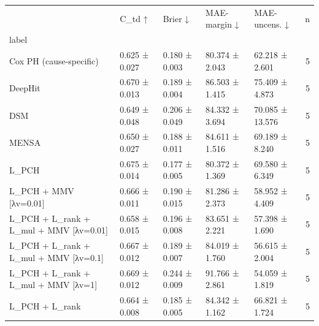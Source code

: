 \begin{tabular}{lllllr}
\toprule
 & C\_td ↑ & Brier ↓ & MAE-margin ↓ & MAE-uncens. ↓ & n \\
label &  &  &  &  &  \\
\midrule
Cox PH (cause-specific) & 0.625 ± 0.027 & 0.180 ± 0.003 & 80.374 ± 2.043 & 62.218 ± 2.601 & 5 \\
DeepHit & 0.670 ± 0.013 & 0.189 ± 0.004 & 86.503 ± 1.415 & 75.409 ± 4.873 & 5 \\
DSM & 0.649 ± 0.048 & 0.206 ± 0.049 & 84.332 ± 3.694 & 70.085 ± 13.576 & 5 \\
MENSA & 0.650 ± 0.027 & 0.188 ± 0.011 & 84.611 ± 1.516 & 69.189 ± 8.240 & 5 \\
L\_PCH & 0.675 ± 0.014 & 0.177 ± 0.005 & 80.372 ± 1.369 & 69.580 ± 6.349 & 5 \\
L\_PCH + MMV [λv=0.01] & 0.666 ± 0.011 & 0.190 ± 0.015 & 81.286 ± 2.373 & 58.952 ± 4.409 & 5 \\
L\_PCH + L\_rank + L\_mul + MMV [λv=0.01] & 0.658 ± 0.015 & 0.196 ± 0.008 & 83.651 ± 2.221 & 57.398 ± 1.690 & 5 \\
L\_PCH + L\_rank + L\_mul + MMV [λv=0.1] & 0.667 ± 0.012 & 0.189 ± 0.007 & 84.019 ± 1.760 & 56.615 ± 2.004 & 5 \\
L\_PCH + L\_rank + L\_mul + MMV [λv=1] & 0.669 ± 0.012 & 0.244 ± 0.009 & 91.766 ± 2.861 & 54.059 ± 1.819 & 5 \\
L\_PCH + L\_rank & 0.664 ± 0.008 & 0.185 ± 0.005 & 84.342 ± 1.162 & 66.821 ± 1.724 & 5 \\
\bottomrule
\end{tabular}
